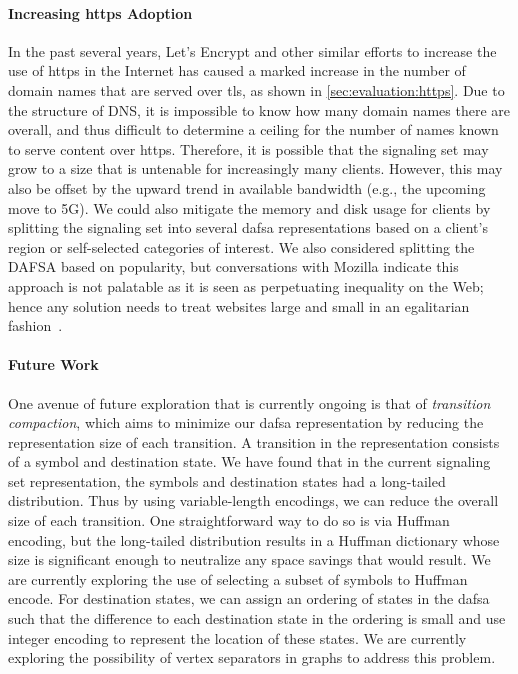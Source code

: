 \paragraph{Increasing \ac{https} Adoption}

In the past several years, Let's Encrypt and other similar efforts to increase
the use of \ac{https} in the Internet has caused a marked increase in the number
of domain names that are served over \ac{tls}, as shown in
\autoref{sec:evaluation:https}. Due to the structure of DNS, it is impossible to
know how many domain names there are overall, and thus difficult to determine a
ceiling for the number of names known to serve content over \ac{https}.
Therefore, it is possible that the signaling set may grow to a size that is
untenable for increasingly many clients.
However, this may also be offset by the upward trend in available bandwidth
(e.g., the upcoming move to 5G).
We could also mitigate the memory and disk usage for clients by splitting the 
signaling set into several \ac{dafsa} representations based 
on a client's region or self-selected categories of interest.
We also considered splitting the DAFSA based on popularity,
but conversations with Mozilla indicate this approach is not palatable
as it is seen as perpetuating inequality on the Web;
hence any solution needs to treat websites large and small 
in an egalitarian fashion~\cite{privatecomm}.

\paragraph{Future Work}

One avenue of future exploration that is currently ongoing is that of
\emph{transition compaction}, which aims to minimize our \ac{dafsa}
representation by reducing the representation size of each transition. A
transition in the representation consists of a symbol and destination state. We
have found that in the current signaling set representation, the symbols and
destination states had a long-tailed distribution. Thus by using variable-length
encodings, we can reduce the overall size of each transition. One
straightforward way to do so is via Huffman encoding, but the long-tailed
distribution results in a Huffman dictionary whose size is significant enough to
neutralize any space savings that would result. We are currently exploring the
use of selecting a subset of symbols to Huffman encode. For destination states,
we can assign an ordering of states in the \ac{dafsa} such that the difference
to each destination state in the ordering is small and use integer encoding to
represent the location of these states. We are currently exploring the
possibility of vertex separators in graphs to address this problem.

